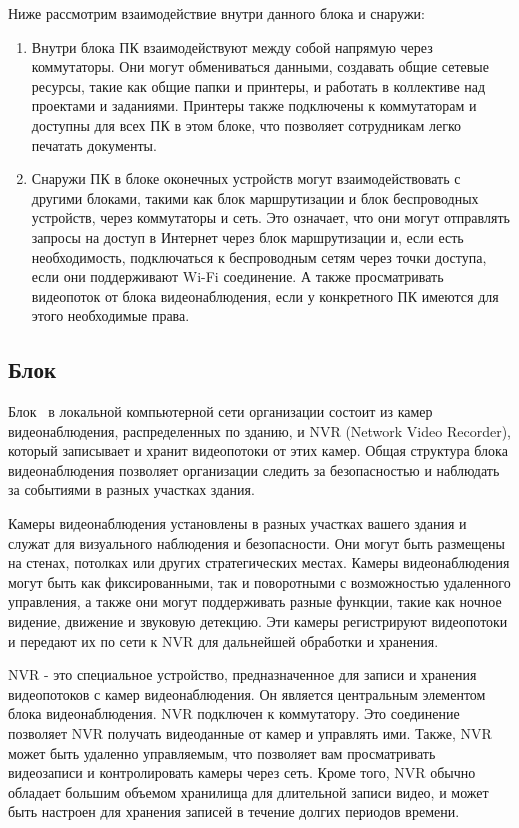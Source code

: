 Ниже рассмотрим взаимодействие внутри данного блока и снаружи:
\begin{enumerate}
    \item Внутри блока ПК взаимодействуют между собой напрямую через коммутаторы. 
    Они могут обмениваться данными, создавать общие сетевые ресурсы, такие как общие папки и принтеры, и работать в коллективе над проектами и заданиями.
    Принтеры также подключены к коммутаторам и доступны для всех ПК в этом блоке, что позволяет сотрудникам легко печатать документы.

    \item Снаружи ПК в блоке оконечных устройств могут взаимодействовать с другими блоками, 
    такими как блок маршрутизации и блок беспроводных устройств, через коммутаторы и сеть. 
    Это означает, что они могут отправлять запросы на доступ в Интернет через блок маршрутизации и,
    если есть необходимость, подключаться к беспроводным сетям через точки доступа, если они поддерживают Wi-Fi соединение.
    А также просматривать видеопоток от блока видеонаблюдения, если у конкретного ПК имеются для этого необходимые права. 
\end{enumerate}

\subsection{Блок \blockVideo}

Блок \blockVideo\ в локальной компьютерной сети организации состоит из камер видеонаблюдения, распределенных по зданию, и NVR (Network Video Recorder), 
который записывает и хранит видеопотоки от этих камер. 
Общая структура блока видеонаблюдения позволяет организации следить за безопасностью и наблюдать за событиями в разных участках здания. 

Камеры видеонаблюдения установлены в разных участках вашего здания и служат для визуального наблюдения и безопасности. 
Они могут быть размещены на стенах, потолках или других стратегических местах.
Камеры видеонаблюдения могут быть как фиксированными, так и поворотными с возможностью удаленного управления, 
а также они могут поддерживать разные функции, такие как ночное видение, движение и звуковую детекцию.
Эти камеры регистрируют видеопотоки и передают их по сети к NVR для дальнейшей обработки и хранения.

NVR - это специальное устройство, предназначенное для записи и хранения видеопотоков с камер видеонаблюдения.
Он является центральным элементом блока видеонаблюдения.
NVR подключен к коммутатору. Это соединение позволяет NVR получать видеоданные от камер и управлять ими. 
Также, NVR может быть удаленно управляемым, что позволяет вам просматривать видеозаписи и контролировать камеры через сеть.
Кроме того, NVR обычно обладает большим объемом хранилища для длительной записи видео, 
и может быть настроен для хранения записей в течение долгих периодов времени.

